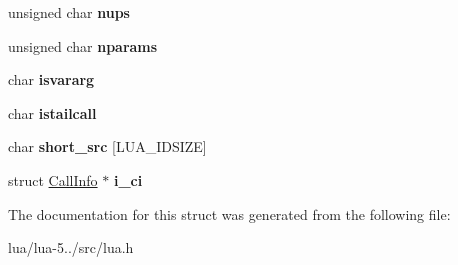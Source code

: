 \begin{DoxyCompactItemize}
\item 
\hypertarget{structlua___debug_ab87c2a6ef686abf10da683f7e9af1b23}{unsigned char {\bfseries nups}}\label{structlua___debug_ab87c2a6ef686abf10da683f7e9af1b23}

\item 
\hypertarget{structlua___debug_adb5efd1576224ce9d14f42f8bfee7a1a}{unsigned char {\bfseries nparams}}\label{structlua___debug_adb5efd1576224ce9d14f42f8bfee7a1a}

\item 
\hypertarget{structlua___debug_a943220c57a4dd46dcc1bcd1198cfea88}{char {\bfseries isvararg}}\label{structlua___debug_a943220c57a4dd46dcc1bcd1198cfea88}

\item 
\hypertarget{structlua___debug_a08e9cf647790ffeb068db293c7572260}{char {\bfseries istailcall}}\label{structlua___debug_a08e9cf647790ffeb068db293c7572260}

\item 
\hypertarget{structlua___debug_a9b953c2fa9ef95a72a9ffc423744e1a4}{char {\bfseries short\+\_\+src} \mbox{[}L\+U\+A\+\_\+\+I\+D\+S\+I\+Z\+E\mbox{]}}\label{structlua___debug_a9b953c2fa9ef95a72a9ffc423744e1a4}

\item 
\hypertarget{structlua___debug_a6cfa3d2272ea187b08164b0a2081d59d}{struct \hyperlink{struct_call_info}{Call\+Info} $\ast$ {\bfseries i\+\_\+ci}}\label{structlua___debug_a6cfa3d2272ea187b08164b0a2081d59d}

\end{DoxyCompactItemize}


The documentation for this struct was generated from the following file\+:\begin{DoxyCompactItemize}
\item 
lua/lua-\/5../src/lua.\+h\end{DoxyCompactItemize}
